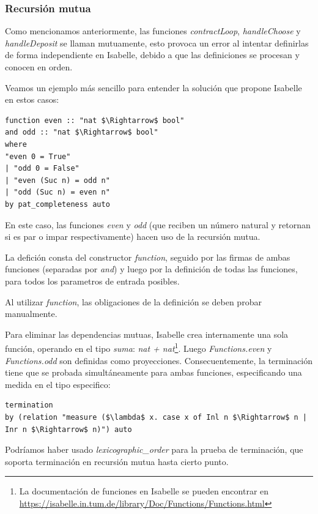 \documentclass[12pt]{book}
\begin{document}
\subsubsection{Recursión mutua}\label{sssec:recursion_mutua}

Como mencionamos anteriormente, las funciones \textit{contractLoop}, \textit{handleChoose} y \textit{handleDeposit} se llaman mutuamente, esto provoca un error al intentar definirlas de forma independiente en Isabelle, debido a que las definiciones se procesan y conocen en orden.

Veamos un ejemplo más sencillo para entender la solución que propone Isabelle en estos casos:

\begin{lstlisting}[style=Isabelle]
function even :: "nat $\Rightarrow$ bool"
and odd :: "nat $\Rightarrow$ bool"
where
"even 0 = True"
| "odd 0 = False"
| "even (Suc n) = odd n"
| "odd (Suc n) = even n"
by pat_completeness auto
\end{lstlisting}

En este caso, las funciones \textit{even} y \textit{odd} (que reciben un número natural y retornan si es par o impar respectivamente) hacen uso de la recursión mutua.

La defición consta del constructor \textit{function}, seguido por las firmas de ambas funciones (separadas por \textit{and}) y luego por la definición de todas las funciones, para todos los parametros de entrada posibles.

Al utilizar \textit{function}, las obligaciones de la definición se deben probar manualmente.

Para eliminar las dependencias mutuas, Isabelle crea internamente una sola función, operando en el tipo \textit{suma}: \textit{nat + nat}\footnote{La documentación de funciones en Isabelle se pueden encontrar en \url{https://isabelle.in.tum.de/library/Doc/Functions/Functions.html}}. Luego \textit{Functions.even} y \textit{Functions.odd} son definidas como proyecciones. Consecuentemente, la terminación tiene que se probada simultáneamente para ambas funciones, especificando una medida en el tipo especifico:

\begin{lstlisting}[style=Isabelle]
termination
by (relation "measure ($\lambda$ x. case x of Inl n $\Rightarrow$ n | Inr n $\Rightarrow$ n)") auto
\end{lstlisting}

Podríamos haber usado \textit{lexicographic\_order} para la prueba de terminación, que soporta terminación en recursión mutua hasta cierto punto. 
\end{document}
